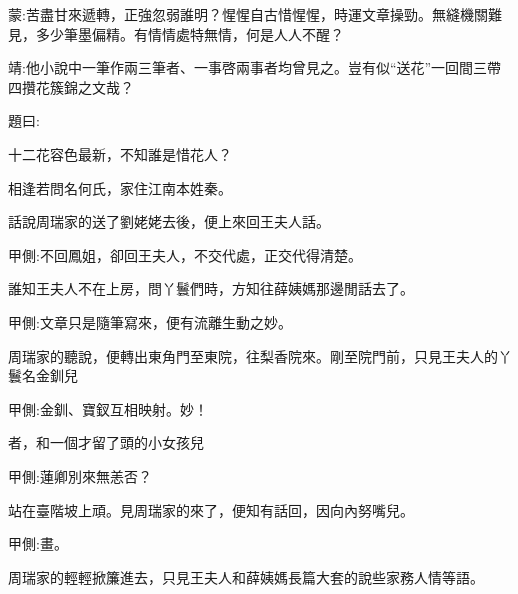 

\begin{parag}
    \begin{note}蒙:苦盡甘來遞轉，正強忽弱誰明？惺惺自古惜惺惺，時運文章操勁。無縫機關難見，多少筆墨偏精。有情情處特無情，何是人人不醒？\end{note}
\end{parag}


\begin{parag}
    \begin{note}靖:他小說中一筆作兩三筆者、一事啓兩事者均曾見之。豈有似“送花”一回間三帶四攢花簇錦之文哉？\end{note}
\end{parag}


\begin{parag}
    題曰:
\end{parag}


\begin{poem}
    \begin{pl}十二花容色最新，不知誰是惜花人？\end{pl}

    \begin{pl}相逢若問名何氏，家住江南本姓秦。\end{pl}
\end{poem}


\begin{parag}
    話說周瑞家的送了劉姥姥去後，便上來回王夫人話。\begin{note}甲側:不回鳳姐，卻回王夫人，不交代處，正交代得清楚。\end{note}誰知王夫人不在上房，問丫鬟們時，方知往薛姨媽那邊閒話去了。\begin{note}甲側:文章只是隨筆寫來，便有流離生動之妙。\end{note}周瑞家的聽說，便轉出東角門至東院，往梨香院來。剛至院門前，只見王夫人的丫鬟名金釧兒\begin{note}甲側:金釧、寶釵互相映射。妙！\end{note}者，和一個才留了頭的小女孩兒\begin{note}甲側:蓮卿別來無恙否？\end{note}站在臺階坡上頑。見周瑞家的來了，便知有話回，因向內努嘴兒。\begin{note}甲側:畫。\end{note}周瑞家的輕輕掀簾進去，只見王夫人和薛姨媽長篇大套的說些家務人情等語。
\end{parag}


